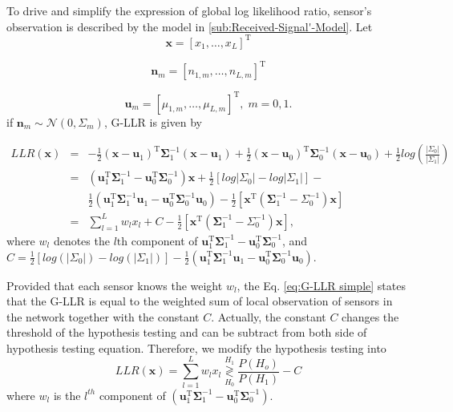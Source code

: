 To drive and simplify the expression of global log likelihood ratio,
sensor\textquoteright{}s observation is described by the model in
\ref{sub:Received-Signal'-Model}. Let 
\[
\mathbf{x}=\left[x_{1},\ldots,x_{L}\right]^{\mathrm{T}}
\]


\[
\mathbf{n}_{m}=\left[n_{1,m},\ldots,n_{L,m}\right]^{\mathrm{T}}
\]


\begin{equation}
\mathbf{u}_{m}=\left[\mu_{1,m},\ldots,\mu_{L,m}\right]^{\mathrm{T}},\; m=0,1.
\end{equation}
 if $\mathbf{n}_{m}\sim\mathcal{N}\left(0,\Sigma_{m}\right)$, G-LLR
is given by 

\begin{eqnarray}
LLR(\mathbf{x}) & = & -\frac{1}{2}\left(\mathbf{x}-\mathbf{u}_{1}\right)^{\mathrm{T}}\mathbf{\Sigma}_{1}^{-1}\left(\mathbf{x}-\mathbf{u}_{1}\right)+\frac{1}{2}\left(\mathbf{x}-\mathbf{u}_{0}\right)^{\mathrm{T}}\mathbf{\Sigma}_{0}^{-1}\left(\mathbf{x}-\mathbf{u}_{0}\right)+\frac{1}{2}log\left(\frac{\left|\Sigma_{0}\right|}{\left|\Sigma_{1}\right|}\right)\\
 & = & \left(\mathbf{u}_{1}^{\mathrm{T}}\mathbf{\Sigma}_{1}^{-1}-\mathbf{u}_{0}^{\mathrm{T}}\mathbf{\Sigma}_{0}^{-1}\right)\mathbf{x}+\frac{1}{2}\left[log\left|\Sigma_{0}\right|-log\left|\Sigma_{1}\right|\right]-\nonumber \\
 &  & \frac{1}{2}\left(\mathbf{u}_{1}^{\mathrm{T}}\mathbf{\Sigma}_{1}^{-1}\mathbf{u}_{1}-\mathbf{u}_{0}^{\mathrm{T}}\mathbf{\Sigma}_{0}^{-1}\mathbf{u}_{0}\right)-\frac{1}{2}\left[\mathbf{x}^{\mathrm{T}}\left(\mathbf{\Sigma}_{1}^{-1}-\Sigma_{0}^{-1}\right)\mathbf{x}\right]\label{eq:G-LLR Expand}\\
 & = & \sum_{l=1}^{L}w_{l}x_{l}+C-\frac{1}{2}\left[\mathbf{x}^{\mathrm{T}}\left(\mathbf{\Sigma}_{1}^{-1}-\Sigma_{0}^{-1}\right)\mathbf{x}\right],\label{eq:G-LLR simple}
\end{eqnarray}
where $w_{l}$ denotes the $l\mbox{th}$ component of $\mathbf{u}_{1}^{\mathrm{T}}\mathbf{\Sigma}_{1}^{-1}-\mathbf{u}_{0}^{\mathrm{T}}\mathbf{\Sigma}_{0}^{-1}$,
and $C=\frac{1}{2}\left[log\left(\left|\Sigma_{0}\right|\right)-log(\left|\Sigma_{1}\right|)\right]-\frac{1}{2}\left(\mathbf{u}_{1}^{\mathrm{T}}\mathbf{\Sigma}_{1}^{-1}\mathbf{u}_{1}-\mathbf{u}_{0}^{\mathrm{T}}\mathbf{\Sigma}_{0}^{-1}\mathbf{u}_{0}\right)$. 

Provided that each sensor knows the weight $w_{l}$, the Eq. \ref{eq:G-LLR simple}
states that the G-LLR is equal to the weighted sum of local observation
of sensors in the network together with the constant $C$. Actually,
the constant $C$ changes the threshold of the hypothesis testing
and can be subtract from both side of hypothesis testing equation.
Therefore, we modify the hypothesis testing into 
\begin{equation}
LLR(\mathbf{x})=\sum_{l=1}^{L}w_{l}x_{l}\underset{H_{0}}{\overset{H_{1}}{\gtrless}}\frac{P\left(H_{o}\right)}{P\left(H_{1}\right)}-C\label{eq:GLLR in weighted sum}
\end{equation}
where $w_{l}$ is the $l^{th}$ component of $\left(\mathbf{u}_{1}^{\mathrm{T}}\mathbf{\Sigma}_{1}^{-1}-\mathbf{u}_{0}^{\mathrm{T}}\mathbf{\Sigma}_{0}^{-1}\right)$. 

